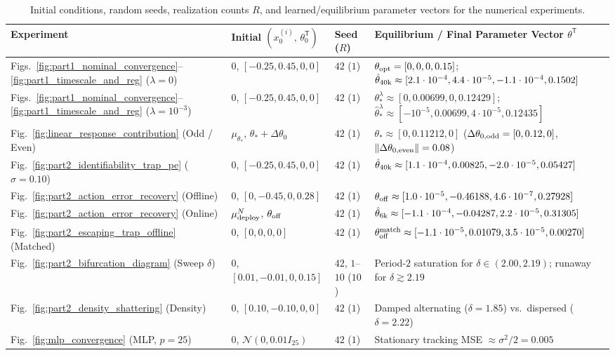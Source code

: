 \begin{table}[htpb]
\centering
\scriptsize
\setlength{\tabcolsep}{1.8pt}
\begin{tabular}{llll}
\toprule
\textbf{Experiment} & \textbf{Initial $(x_0^{(i)},\, \theta_0^{\mathsf T})$} & \textbf{Seed ($R$)} & \textbf{Equilibrium / Final Parameter Vector $\theta^{\mathsf T}$} \\
\midrule
Figs.~\ref{fig:part1_nominal_convergence}--\ref{fig:part1_timescale_and_reg} ($\lambda=0$) & $0$, $[-0.25, 0.45, 0, 0]$ & $42$ ($1$) & $\theta_{\rm opt}=[0,0,0,0.15]$; $\hat\theta_{40{\rm k}}\approx[2.1\cdot 10^{-4},4.4\cdot 10^{-5},-1.1\cdot 10^{-4},0.1502]$ \\
Figs.~\ref{fig:part1_nominal_convergence}--\ref{fig:part1_timescale_and_reg} ($\lambda=10^{-3}$) & $0$, $[-0.25, 0.45, 0, 0]$ & $42$ ($1$) & $\theta_*^\lambda\approx[0, 0.00699, 0, 0.12429]$; $\hat\theta_*^\lambda\approx[-10^{-5}, 0.00699, 4\cdot 10^{-5}, 0.12435]$ \\
Fig.~\ref{fig:linear_response_contribution} (Odd / Even) & $\mu_{\theta_*}$, $\theta_*+\Delta\theta_0$ & $42$ ($1$) & $\theta_*\approx[0, 0.11212, 0]$ ($\Delta\theta_{0,\rm odd}=[0,0.12,0]$, $\left\lVert \Delta\theta_{0,\rm even}\right\rVert=0.08$) \\
Fig.~\ref{fig:part2_identifiability_trap_pe} ($\sigma=0.10$) & $0$, $[-0.25, 0.45, 0, 0]$ & $42$ ($1$) & $\hat\theta_{40{\rm k}}\approx[1.1\cdot 10^{-4}, 0.00825, -2.0\cdot 10^{-5}, 0.05427]$ \\
Fig.~\ref{fig:part2_action_error_recovery} (Offline) & $0$, $[0, -0.45, 0, 0.28]$ & $42$ ($1$) & $\theta_{\rm off}\approx[1.0\cdot 10^{-5}, -0.46188, 4.6\cdot 10^{-7}, 0.27928]$ \\
Fig.~\ref{fig:part2_action_error_recovery} (Online) & $\mu_{\rm deploy}^N$, $\theta_{\rm off}$ & $42$ ($1$) & $\hat\theta_{6{\rm k}}\approx[-1.1\cdot 10^{-4}, -0.04287, 2.2\cdot 10^{-5}, 0.31305]$ \\
Fig.~\ref{fig:part2_escaping_trap_offline} (Matched) & $0$, $[0, 0, 0, 0]$ & $42$ ($1$) & $\theta_{\rm off}^{\rm match}\approx[-1.1\cdot 10^{-5}, 0.01079, 3.5\cdot 10^{-5}, 0.00270]$ \\
Fig.~\ref{fig:part2_bifurcation_diagram} (Sweep $\delta$) & $0$, $[0.01, -0.01, 0, 0.15]$ & $42$, $1$--$10$ ($10$) & Period-$2$ saturation for $\delta\in(2.00,2.19)$; runaway for $\delta\gtrsim 2.19$ \\
Fig.~\ref{fig:part2_density_shattering} (Density) & $0$, $[0.10, -0.10, 0, 0]$ & $42$ ($1$) & Damped alternating ($\delta=1.85$) vs.\ dispersed ($\delta=2.22$) \\
Fig.~\ref{fig:mlp_convergence} (MLP, $p=25$) & $0$, $\mathcal{N}(0,0.01 I_{25})$ & $42$ ($1$) & Stationary tracking MSE $\approx \sigma^2/2 = 0.005$ \\
\bottomrule
\end{tabular}
\caption{Initial conditions, random seeds, realization counts $R$, and learned/equilibrium parameter vectors for the numerical experiments.}
\label{tab:reproducibility_vectors}
\end{table}

